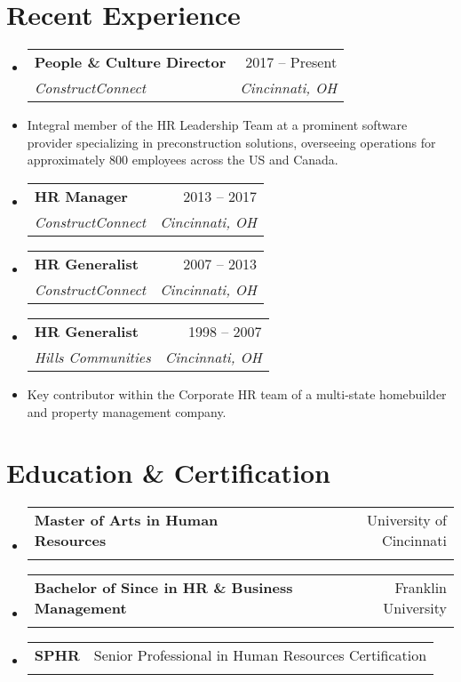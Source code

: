 \documentclass[letterpaper,11pt]{article}
\makeatletter
\newcommand{\resumeItem}[1]{
  \item\small{
    {#1 \vspace{-2pt}}
  }
}
\newcommand{\resumeSubheading}[4]{
  \vspace{-2pt}\item
    \begin{tabular*}{0.97\textwidth}[t]{l@{\extracolsep{\fill}}r}
      \textbf{#1} & #2 \\
      \textit{\small#3} & \textit{\small #4} \\
    \end{tabular*}\vspace{-7pt}
}
\newcommand{\resumeSubHeadingListStart}{\begin{itemize}[leftmargin=0.15in, label={}]}
\newcommand{\resumeSubHeadingListEnd}{\end{itemize}}
\makeatother
\begin{document}
\section {Recent Experience}
    \resumeSubHeadingListStart
        \resumeSubheading 
            {{People \& Culture Director}  \emph{\small\textmd{}}}{2017 -- Present} {ConstructConnect } {Cincinnati, OH}
            \resumeItem{Integral member of the HR Leadership Team at a prominent software provider specializing in preconstruction solutions, overseeing operations for approximately 800 employees across the US and Canada.}
         \resumeSubheading 
            {{HR Manager}  \emph{\small\textmd{}}}{2013 -- 2017} {ConstructConnect} {Cincinnati, OH}  
         \resumeSubheading 
            {{HR Generalist}  \emph{\small\textmd{}}}{2007 -- 2013} {ConstructConnect} {Cincinnati, OH}  
        \resumeSubheading 
            {{HR Generalist}  \emph{\small\textmd{}}}{1998 -- 2007} {Hills Communities} {Cincinnati, OH}
            \resumeItem{Key contributor within the Corporate HR team of a multi-state homebuilder and property
management company.}
    \resumeSubHeadingListEnd

\section{Education \& Certification}
    \resumeSubHeadingListStart
        \resumeSubheading{Master of Arts in Human Resources}{University of Cincinnati}{}{}
        \resumeSubheading{Bachelor of Since in HR \& Business Management}{Franklin University}{}{}
        \resumeSubheading{SPHR}{Senior Professional in Human Resources Certification}{}{}
    \resumeSubHeadingListEnd
\end{document}
